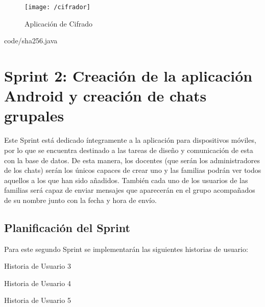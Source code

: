 \begin{figure}[!h]
	\begin{center}
		\texttt{[image: /cifrador]}
		\caption{Aplicación de Cifrado}
		\label{fig:cifrador}
	\end{center}
\end{figure}

\clearpage


						{code/sha256.java}

\clearpage

\section{Sprint 2: Creación de la aplicación Android y creación de chats grupales}
Este Sprint está dedicado íntegramente a la aplicación para dispositivos móviles, por lo que se encuentra destinado a las tareas de diseño y comunicación de esta con la base de datos. De esta manera, los docentes (que serán los administradores de los chats) serán los únicos capaces de crear uno y las familias podrán ver todos aquellos a los que han sido añadidos. También cada uno de los usuarios de las familias será capaz de enviar mensajes que aparecerán en el grupo acompañados de su nombre junto con la fecha y hora de envío.

\subsection{Planificación del Sprint}
Para este segundo Sprint se implementarán las siguientes historias de usuario:

\begin{table}[!htbp]
	\centering
	{\small
		
	}
	\caption[Historia de Usuario 3]
	{Historia de Usuario 3}
	\label{tab:historia3}
\end{table}

\begin{table}[!htbp]
	\centering
	{\small
		
	}
	\caption[Historia de Usuario 4]
	{Historia de Usuario 4}
	\label{tab:historia4}
\end{table}

\begin{table}[!htbp]
	\centering
	{\small
		
	}
	\caption[Historia de Usuario 5]
	{Historia de Usuario 5}
	\label{tab:historia5}
\end{table}

